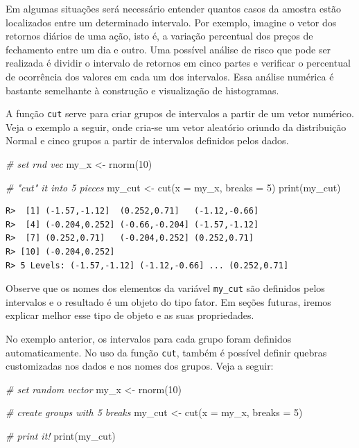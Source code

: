 \documentclass[
  11pt,
]{book}
\newenvironment{Shaded}{\begin{snugshade}}{\end{snugshade}}
\newcommand{\AttributeTok}[1]{\textcolor[rgb]{0.61,0.61,0.61}{#1}}
\newcommand{\CommentTok}[1]{\textcolor[rgb]{0.37,0.37,0.37}{\textit{#1}}}
\newcommand{\DecValTok}[1]{\textcolor[rgb]{0.06,0.06,0.06}{#1}}
\newcommand{\FunctionTok}[1]{\textcolor[rgb]{0,0,0}{#1}}
\newcommand{\NormalTok}[1]{#1}
\newcommand{\OtherTok}[1]{\textcolor[rgb]{0.37,0.37,0.37}{#1}}
\begin{document}
Em algumas situações será necessário entender quantos casos da amostra estão localizados entre um determinado intervalo. Por exemplo, imagine o vetor dos retornos diários de uma ação, isto é, a variação percentual dos preços de fechamento entre um dia e outro. Uma possível análise de risco que pode ser realizada é dividir o intervalo de retornos em cinco partes e verificar o percentual de ocorrência dos valores em cada um dos intervalos. Essa análise numérica é bastante semelhante à construção e visualização de histogramas.

A função \texttt{cut} serve para criar grupos de intervalos a partir de um vetor numérico. Veja o exemplo a seguir, onde cria-se um vetor aleatório oriundo da distribuição Normal e cinco grupos a partir de intervalos definidos pelos dados. 

\begin{Shaded}
\begin{Highlighting}[]
\CommentTok{\# set rnd vec}
\NormalTok{my\_x }\OtherTok{\textless{}{-}} \FunctionTok{rnorm}\NormalTok{(}\DecValTok{10}\NormalTok{)}

\CommentTok{\# "cut" it into 5 pieces}
\NormalTok{my\_cut }\OtherTok{\textless{}{-}} \FunctionTok{cut}\NormalTok{(}\AttributeTok{x =}\NormalTok{ my\_x, }\AttributeTok{breaks =} \DecValTok{5}\NormalTok{)}
\FunctionTok{print}\NormalTok{(my\_cut)}
\end{Highlighting}
\end{Shaded}

\begin{verbatim}
R>  [1] (-1.57,-1.12]  (0.252,0.71]   (-1.12,-0.66] 
R>  [4] (-0.204,0.252] (-0.66,-0.204] (-1.57,-1.12] 
R>  [7] (0.252,0.71]   (-0.204,0.252] (0.252,0.71]  
R> [10] (-0.204,0.252]
R> 5 Levels: (-1.57,-1.12] (-1.12,-0.66] ... (0.252,0.71]
\end{verbatim}

Observe que os nomes dos elementos da variável \texttt{my\_cut} são definidos pelos intervalos e o resultado é um objeto do tipo fator. Em seções futuras, iremos explicar melhor esse tipo de objeto e as suas propriedades.

No exemplo anterior, os intervalos para cada grupo foram definidos automaticamente. No uso da função \texttt{cut}, também é possível definir quebras customizadas nos dados e nos nomes dos grupos. Veja a seguir:

\begin{Shaded}
\begin{Highlighting}[]
\CommentTok{\# set random vector}
\NormalTok{my\_x }\OtherTok{\textless{}{-}} \FunctionTok{rnorm}\NormalTok{(}\DecValTok{10}\NormalTok{)}

\CommentTok{\# create groups with 5 breaks}
\NormalTok{my\_cut }\OtherTok{\textless{}{-}} \FunctionTok{cut}\NormalTok{(}\AttributeTok{x =}\NormalTok{ my\_x, }\AttributeTok{breaks =} \DecValTok{5}\NormalTok{)}

\CommentTok{\# print it!}
\FunctionTok{print}\NormalTok{(my\_cut)}
\end{Highlighting}
\end{Shaded}
\end{document}
